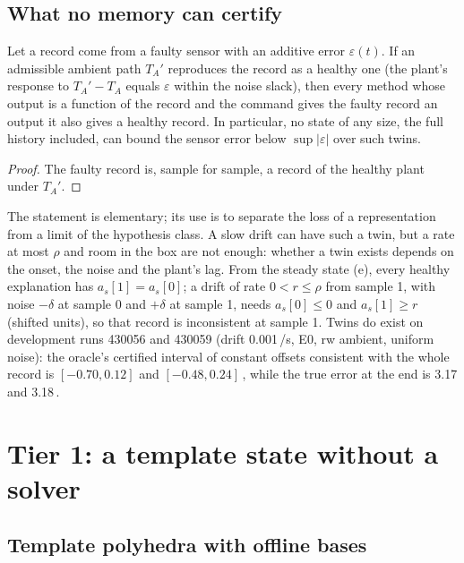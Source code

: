 \subsection{What no memory can certify}\label{sec:twin}

\begin{proposition}\label{prop:twin}
Let a record come from a faulty sensor with an additive error $\varepsilon(t)$. If an admissible ambient path $T_A'$
reproduces the record as a healthy one (the plant's response to $T_A' - T_A$ equals $\varepsilon$ within the noise
slack), then every method whose output is a function of the record and the command gives the faulty record an output
it also gives a healthy record. In particular, no state of any size, the full history included, can bound the sensor
error below $\sup|\varepsilon|$ over such twins.
\end{proposition}
\begin{proof}
The faulty record is, sample for sample, a record of the healthy plant under $T_A'$.
\end{proof}

The statement is elementary; its use is to separate the loss of a representation from a limit of the hypothesis
class. A slow drift can have such a twin, but a rate at most $\rho$ and room in the box are not enough: whether a twin
exists depends on the onset, the noise and the plant's lag. From the steady state (e), every healthy explanation has
$a_s[1] = a_s[0]$; a drift of rate $0<r\le\rho$ from sample 1, with noise $-\delta$ at sample 0 and $+\delta$ at sample
1, needs $a_s[0]\le0$ and $a_s[1]\ge r$ (shifted units), so that record is inconsistent at sample 1. Twins do exist on
development runs 430056 and 430059 (drift 0.001\,\degC/s, E0, rw ambient, uniform noise): the oracle's certified
interval of constant offsets consistent with the whole record is $[-0.70, 0.12]$ and $[-0.48, 0.24]$\,\degC, while the true error at the end is 3.17 and 3.18\,\degC.

\section{Tier 1: a template state without a solver}

\subsection{Template polyhedra with offline bases}\label{sec:tmpl}

